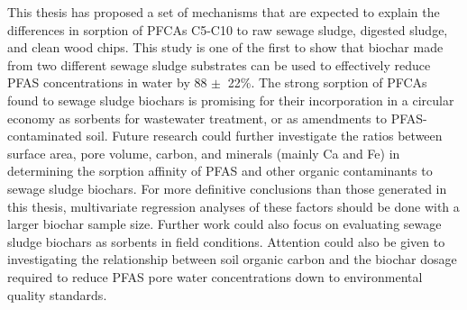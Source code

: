 This thesis has proposed a set of mechanisms that are expected to explain the differences in sorption of PFCAs C5-C10 to raw sewage sludge, digested sludge, and clean wood chips. This study is one of the first to show that biochar made from two different sewage sludge substrates can be used to effectively reduce PFAS concentrations in water by 88 $\pm~$ 22\%. The strong sorption of PFCAs found to sewage sludge biochars is promising for their incorporation in a circular economy as sorbents for wastewater treatment, or as amendments to PFAS-contaminated soil. Future research could further investigate the ratios between surface area, pore volume, carbon, and minerals (mainly Ca and Fe) in determining the sorption affinity of PFAS and other organic contaminants to sewage sludge biochars. For more definitive conclusions than those generated in this thesis, multivariate regression analyses of these factors should be done with a larger biochar sample size. Further work could also focus on evaluating sewage sludge biochars as sorbents in field conditions. Attention could also be given to investigating the relationship between soil organic carbon and the biochar dosage required to reduce PFAS pore water concentrations down to environmental quality standards. 



 







